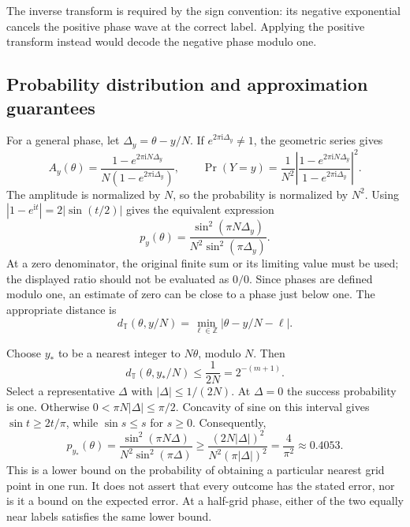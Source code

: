 \documentclass[11pt,oneside,openany]{book}
\newcommand{\ii}{\mathrm{i}}
\theoremstyle{definition}
\begin{document}
The inverse transform is required by the sign convention: its negative exponential cancels the positive phase wave at the correct label. Applying the positive transform instead would decode the negative phase modulo one.

\subsection{Probability distribution and approximation guarantees}

For a general phase, let $\Delta_y=\theta-y/N$. If $e^{2\pi\ii\Delta_y}\ne1$, the geometric series gives
\begin{equation}
 A_y(\theta)=\frac{1-e^{2\pi\ii N\Delta_y}}{N(1-e^{2\pi\ii\Delta_y})},
 \qquad
 \Pr(Y=y)=\frac1{N^2}
 \left|\frac{1-e^{2\pi\ii N\Delta_y}}{1-e^{2\pi\ii\Delta_y}}\right|^2.
 \label{eq:phase:qpeprobgeom}
\end{equation}
The amplitude is normalized by $N$, so the probability is normalized by $N^2$. Using $|1-e^{\ii t}|=2|\sin(t/2)|$ gives the equivalent expression
\begin{equation}
 p_y(\theta)=\frac{\sin^2(\pi N\Delta_y)}{N^2\sin^2(\pi\Delta_y)}.
 \label{eq:phase:qpeprobsine}
\end{equation}
At a zero denominator, the original finite sum or its limiting value must be used; the displayed ratio should not be evaluated as $0/0$. Since phases are defined modulo one, an estimate of zero can be close to a phase just below one. The appropriate distance is
\begin{equation}
 d_{\mathbb T}(\theta,y/N)=\min_{\ell\in\mathbb Z}|\theta-y/N-\ell|.
 \label{eq:phase:circulardistance}
\end{equation}

Choose $y_*$ to be a nearest integer to $N\theta$, modulo $N$. Then
\begin{equation}
 d_{\mathbb T}(\theta,y_*/N)\le\frac1{2N}=2^{-(m+1)}.
\end{equation}
Select a representative $\Delta$ with $|\Delta|\le1/(2N)$. At $\Delta=0$ the success probability is one. Otherwise $0<\pi N|\Delta|\le\pi/2$. Concavity of sine on this interval gives $\sin t\ge2t/\pi$, while $\sin s\le s$ for $s\ge0$. Consequently,
\begin{equation}
 p_{y_*}(\theta)
 =\frac{\sin^2(\pi N\Delta)}{N^2\sin^2(\pi\Delta)}
 \ge\frac{(2N|\Delta|)^2}{N^2(\pi|\Delta|)^2}
 =\frac4{\pi^2}\approx0.4053.
 \label{eq:phase:qpesuccess}
\end{equation}
This is a lower bound on the probability of obtaining a particular nearest grid point in one run. It does not assert that every outcome has the stated error, nor is it a bound on the expected error. At a half-grid phase, either of the two equally near labels satisfies the same lower bound.
\end{document}
